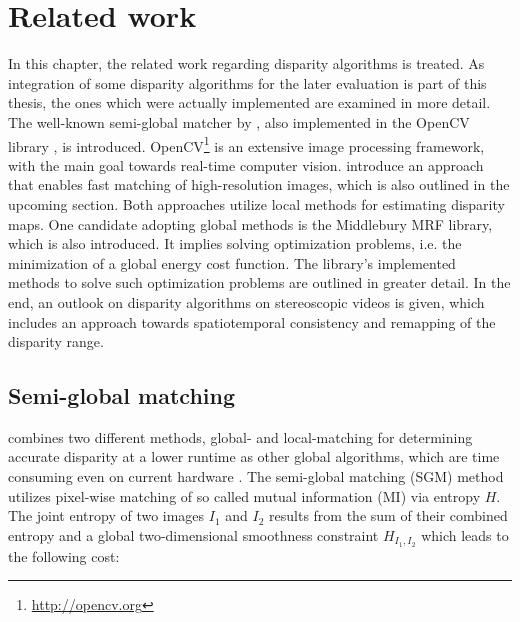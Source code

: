 \chapter{Related work}
\label{chap:related}

In this chapter, the related work regarding disparity algorithms is treated.
As integration of some disparity algorithms for the later evaluation is part of this thesis, the ones which were actually implemented are examined in more detail.
The well-known semi-global matcher by \citeauthor{hirschmuller2005accurate}, also implemented in the OpenCV library \citep{opencv_library}, is introduced.
OpenCV\footnote{\url{http://opencv.org}} is an extensive image processing framework, with the main goal towards real-time computer vision.
\citeauthor{Geiger2010ACCV} introduce an approach that enables fast matching of high-resolution images, which is also outlined in the upcoming section.
\newline\newline\noindent Both approaches utilize local methods for estimating disparity maps.
One candidate adopting global methods is the Middlebury MRF library, which is also introduced.
It implies solving optimization problems, i.e. the minimization of a global energy cost function.
The library’s implemented methods to solve such optimization problems are outlined in greater detail.
In the end, an outlook on disparity algorithms on stereoscopic videos is given, which includes an approach towards spatiotemporal consistency and remapping of the disparity range.

\section{Semi-global matching}

\citeauthor{hirschmuller2005accurate} combines two different methods, global- and local-matching for determining accurate disparity at a lower runtime as other global algorithms,  which are time consuming even on current hardware \citep{hirschmuller2005accurate, hirschmuller2008stereo}.
\newline\newline\noindent The semi-global matching (SGM) method utilizes pixel-wise matching of so called mutual information (MI) via entropy $H$.
The joint entropy of two images $I_1$ and $I_2$ results from the sum of their combined entropy and a global two-dimensional smoothness constraint $H_{I_1,I_2}$ which leads to the following cost:

